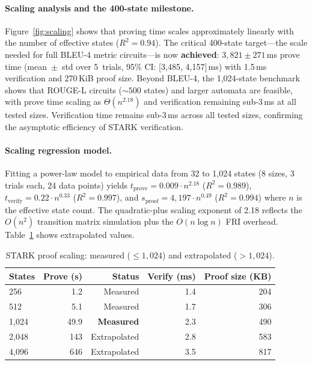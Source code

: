 \documentclass[11pt]{article}
\begin{document}
\paragraph{Scaling analysis and the 400-state milestone.}
Figure~\ref{fig:scaling} shows that proving time scales approximately
linearly with the number of effective states ($R^2 = 0.94$).
The critical 400-state target---the scale needed for full BLEU-4
metric circuits---is now \textbf{achieved}: $3{,}821 \pm 271$\,ms
prove time (mean~$\pm$~std over 5~trials, 95\% CI: [3{,}485, 4{,}157]\,ms)
with 1.5\,ms verification and 270\,KiB proof size.
Beyond BLEU-4, the 1{,}024-state benchmark shows that ROUGE-L circuits
(${\sim}500$ states) and larger automata are feasible, with prove time scaling
as $\Theta(n^{2.18})$ and verification remaining sub-3\,ms at all tested sizes.
Verification time remains sub-3\,ms across all tested sizes,
confirming the asymptotic efficiency of STARK verification.

\paragraph{Scaling regression model.}
Fitting a power-law model to empirical data from 32 to 1{,}024 states
(8 sizes, 3 trials each, 24 data points) yields
$t_{\text{prove}} = 0.009 \cdot n^{2.18}$ ($R^2 = 0.989$),
$t_{\text{verify}} = 0.22 \cdot n^{0.33}$ ($R^2 = 0.997$),
and $s_{\text{proof}} = 4{,}197 \cdot n^{0.49}$ ($R^2 = 0.994$)
where $n$ is the effective state count.
The quadratic-plus scaling exponent of 2.18 reflects the
$O(n^2)$ transition matrix simulation plus the $O(n \log n)$
FRI overhead.
Table~\ref{tab:scaling-extrapolation} shows extrapolated values.

\begin{table}[h]
\centering
\caption{STARK proof scaling: measured ($\leq 1{,}024$) and extrapolated ($> 1{,}024$).}
\label{tab:scaling-extrapolation}
\begin{tabular}{lrrrr}
\toprule
States & Prove (s) & Status & Verify (ms) & Proof size (KB) \\
\midrule
256 & 1.2 & Measured & 1.4 & 204 \\
512 & 5.1 & Measured & 1.7 & 306 \\
1{,}024 & 49.9 & \textbf{Measured} & 2.3 & 490 \\
2{,}048 & 143 & Extrapolated & 2.8 & 583 \\
4{,}096 & 646 & Extrapolated & 3.5 & 817 \\
\bottomrule
\end{tabular}
\end{table}
\end{document}

